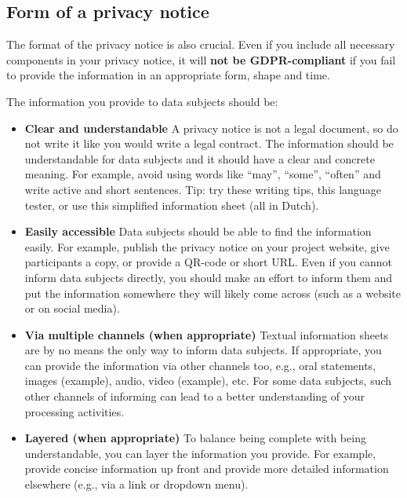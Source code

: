 \documentclass[
]{book}
\begin{document}
\hypertarget{form-of-a-privacy-notice}{%
\subsection{Form of a privacy notice}\label{form-of-a-privacy-notice}}

The format of the privacy notice is also crucial. Even if you include all
necessary components in your privacy notice, it will \textbf{not be GDPR-compliant}
if you fail to provide the information in an appropriate form, shape and time.

The information you provide to data subjects should be:

\begin{itemize}
\item
  \textbf{Clear and understandable}
  A privacy notice is not a legal document, so do not write it like you would
  write a legal contract. The information should be understandable for data
  subjects and it should have a clear and concrete meaning. For example, avoid
  using words like ``may'', ``some'', ``often'' and write active and short sentences.
  Tip: try these
  writing tips,
  this language tester,
  or use this
  simplified information sheet (all in Dutch).
\item
  \textbf{Easily accessible}
  Data subjects should be able to find the information easily. For example, publish
  the privacy notice on your project website, give participants a copy, or provide
  a QR-code or short URL. Even if you cannot inform data subjects directly, you
  should make an effort to inform them and put the information somewhere they will
  likely come across (such as a website or on social media).
\item
  \textbf{Via multiple channels (when appropriate)}
  Textual information sheets are by no means the only way to inform data subjects.
  If appropriate, you can provide the information via other channels too, e.g.,
  oral statements, images
  (example),
  audio, video
  (example),
  etc. For some data subjects, such other channels of informing can lead to a better
  understanding of your processing activities.
\item
  \textbf{Layered (when appropriate)}
  To balance being complete with being understandable, you can layer the
  information you provide. For example, provide concise information up front and
  provide more detailed information elsewhere (e.g., via a link or dropdown menu).
\end{itemize}
\end{document}
